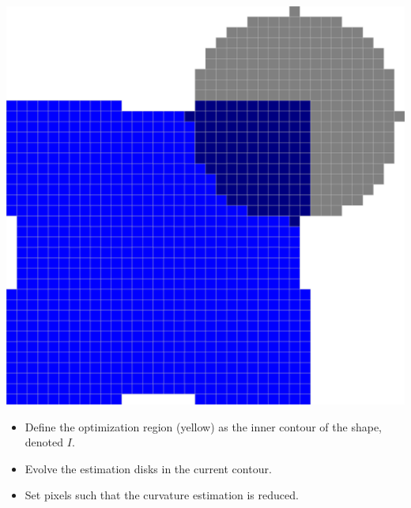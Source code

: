 \begin{frame}
\begin{minipage}[t][0.5\textheight]{1\textwidth}
{\includegraphics[scale=0.1]{figures/non-submodular-elastica/shape-opt-ball-after.png}}
\end{minipage}

\begin{itemize}
\item{Define the optimization region (yellow) as the inner contour of the shape, denoted $I$.}
\item{Evolve the estimation disks in the current contour.}
\item{Set pixels such that the curvature estimation is reduced.}
\end{itemize}
\end{frame}

